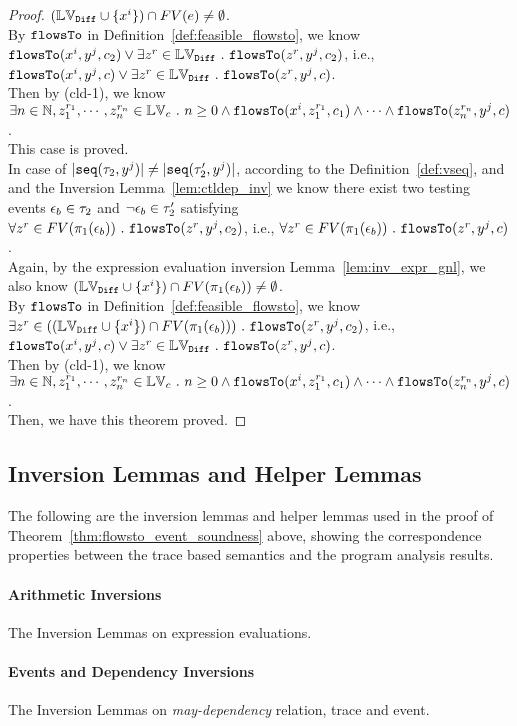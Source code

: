 \begin{proof}
$(\mathbb{LV}_{\mathtt{Diff}} \cup \{x^i\} )\cap FV(e) \neq \emptyset$.
\\
By $\mathtt{flowsTo}$ in Definition~\ref{def:feasible_flowsto}, 
we know $\mathtt{flowsTo}(x^i, y^j, c_2) \lor 
\exists z^r \in \mathbb{LV}_{\mathtt{Diff}} ~.~ \mathtt{flowsTo}(z^r, y^j, c_2)$, i.e., 
\\
$\mathtt{flowsTo}(x^i, y^j, c) \lor 
\exists z^r \in \mathbb{LV}_{\mathtt{Diff}} ~.~ \mathtt{flowsTo}(z^r, y^j, c)$.
\\
Then by (cld-1),
we know 
\\
$\exists n \in \mathbb{N}, z_1^{r_1}, \cdots, z_n^{r_n} \in \mathbb{LV}_{{c}} ~.~ n \geq 0 \land
\mathtt{flowsTo}(x^i,  z_1^{r_1}, c_1) 
\land \cdots \land \mathtt{flowsTo}(z_n^{r_n}, y^j, c)$.
\\
This case is proved.
\\
In case of $|\mathtt{seq}(\mathtt{\tau}_2, y^j)| \neq |\mathtt{seq}(\mathtt{\tau}_2', y^j)|$,  according to the Definition~\ref{def:vseq},
and  and the 
Inversion Lemma~\ref{lem:ctldep_inv} we know 
there exist two testing events $\mathtt{\epsilon}_b \in \mathtt{\tau}_2$ and $\neg\mathtt{\epsilon}_b \in \mathtt{\tau}_2'$ satisfying 
\\
$\forall z^r \in FV(\pi_1(\mathtt{\epsilon}_b)) ~.~ \mathtt{flowsTo}(z^r, y^j, c_2)$, 
i.e., $\forall z^r \in FV(\pi_1(\mathtt{\epsilon}_b)) ~.~ \mathtt{flowsTo}(z^r, y^j, c)$.
\\
Again, by the expression evaluation inversion Lemma~\ref{lem:inv_expr_gnl}, we also know 
$(\mathbb{LV}_{\mathtt{Diff}} \cup \{x^i\} )\cap FV(\pi_1(\mathtt{\epsilon}_b)) \neq \emptyset$.
\\
By $\mathtt{flowsTo}$ in Definition~\ref{def:feasible_flowsto}, 
we know $
\exists z^r \in ((\mathbb{LV}_{\mathtt{Diff}} \cup \{x^i\} ) \cap FV(\pi_1(\mathtt{\epsilon}_b)))~.~ \mathtt{flowsTo}(z^r, y^j, c_2)$, i.e., 
\\
$\mathtt{flowsTo}(x^i, y^j, c) \lor 
\exists z^r \in \mathbb{LV}_{\mathtt{Diff}} ~.~ \mathtt{flowsTo}(z^r, y^j, c)$.
\\
Then by (cld-1),
we know 
\\
$\exists n \in \mathbb{N}, z_1^{r_1}, \cdots, z_n^{r_n} \in \mathbb{LV}_{{c}} ~.~ n \geq 0 \land
\mathtt{flowsTo}(x^i,  z_1^{r_1}, c_1) 
\land \cdots \land \mathtt{flowsTo}(z_n^{r_n}, y^j, c)$.
\\
  Then, we have this theorem proved.
\end{proof}

\subsection{Inversion Lemmas and Helper Lemmas}
The following are the inversion lemmas and helper lemmas used in the proof of Theorem~\ref{thm:flowsto_event_soundness} above,
showing the correspondence properties between the trace based semantics and the program analysis results.
\paragraph*{Arithmetic Inversions}
The Inversion Lemmas on expression evaluations.

\paragraph*{Events and Dependency Inversions}
The Inversion Lemmas on \emph{may-dependency} relation, trace and event.
